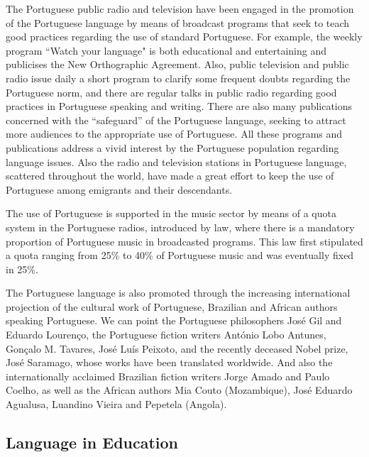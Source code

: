 \documentclass[]{../metanetpaper}
\begin{document}
\begin{multicols}{2}

The Portuguese public radio and television have been engaged in the promotion of the Portuguese language by means of broadcast programs that seek to teach good practices regarding the use of standard Portuguese. For example, the weekly program “Watch your language" is both educational and entertaining and publicises the New Orthographic Agreement. Also, public television and public radio issue daily a short program to clarify some frequent doubts regarding the Portuguese norm, and there are regular talks in public radio regarding good practices in Portuguese speaking and writing. There are also many publications concerned with the “safeguard” of the Portuguese language, seeking to attract more audiences to the appropriate use of Portuguese. All these programs and publications address a vivid interest by the Portuguese population regarding language issues. Also the radio and television stations in Portuguese language, scattered throughout the world, have made a great effort to keep the use of Portuguese among emigrants and their descendants.

The use of Portuguese is supported in the music sector by means of a quota system in the Portuguese radios, introduced by law, where there is a mandatory proportion of Portuguese music in broadcasted programs. This law first stipulated a quota ranging from 25\% to 40\% of Portuguese music and was eventually fixed in 25\%. 


The Portuguese language is also promoted through the increasing international projection of the cultural work of Portuguese, Brazilian and African authors speaking Portuguese. We can point the Portuguese philosophers José Gil and Eduardo Lourenço, the Portuguese fiction writers António Lobo Antunes, Gonçalo M. Tavares, José Luís Peixoto, and the recently deceased Nobel prize, José Saramago, whose works have been translated worldwide. And also the internationally acclaimed Brazilian fiction writers Jorge Amado and Paulo Coelho, as well as the African authors Mia Couto (Mozambique), José Eduardo Agualusa, Luandino Vieira and Pepetela (Angola).

\subsection{Language in Education}


\end{multicols}
\end{document}
